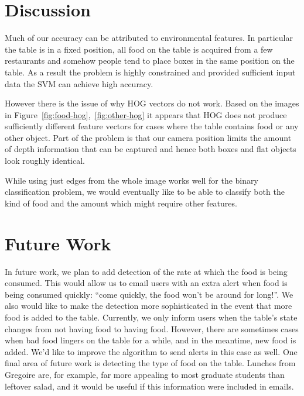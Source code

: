 \section{Discussion}
Much of our accuracy can be attributed to environmental features. In particular the table is in a fixed position, all
food on the table is acquired from a few restaurants and somehow people tend to place boxes in the same position on the
table. As a result the problem is highly constrained and provided sufficient input data the SVM can achieve high
accuracy.

However there is the issue of why HOG vectors do not work. Based on the images in
Figure~\ref{fig:food-hog},~\ref{fig:other-hog} it appears that HOG does not produce sufficiently different feature
vectors for cases where the table contains food or any other object. Part of the problem is that our camera position
limits the amount of depth information that can be captured and hence both boxes and flat objects look roughly
identical.

While using just edges from the whole image works well for the binary classification problem, we would eventually like
to be able to classify both the kind of food and the amount which might require other features.


\section{Future Work}
In future work, we plan to add detection of the rate at which the food is being consumed.
This would allow us to email users with an extra alert when food is being consumed quickly:
``come quickly, the food won't be around for long!''.  We also would like to make the detection
more sophisticated in the event that more food is added to the table.  Currently, we 
only inform users when the table's state changes from not having food to having food.
However, there are sometimes cases when bad food lingers on the table for a while, and in the
meantime, new food is added.  We'd like to improve the algorithm to send alerts in this case
as well. One final area of future work is detecting the type of food on the table. Lunches
from Gregoire are, for example, far more appealing to most graduate students than leftover salad,
and it would be useful if this information were included in emails.
